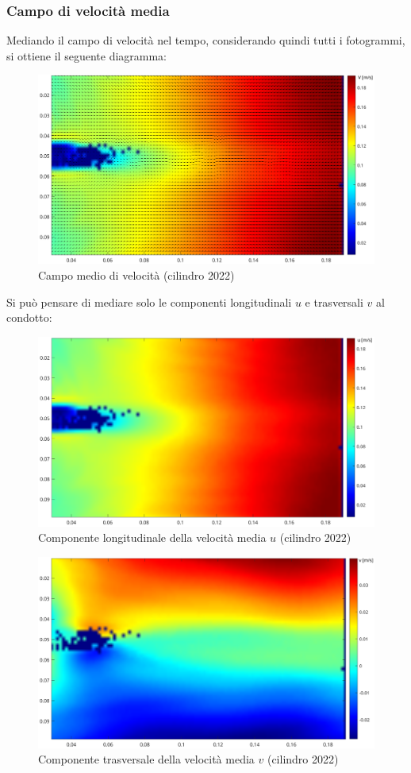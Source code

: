 \subsubsection{Campo di velocità media}
Mediando il campo di velocità nel tempo, considerando quindi tutti i fotogrammi, si ottiene il seguente diagramma:
\begin{figure}[H]
    \centering
    \includegraphics[width=.92\textwidth]{images/11/mean.png}
    \caption{Campo medio di velocità (cilindro 2022)}
\end{figure}

\noindent Si può pensare di mediare solo le componenti longitudinali $u$ e trasversali $v$ al condotto:
\begin{figure}[H]
    \centering
    \includegraphics[width=.92\textwidth]{images/11/Umean.png}
    \caption{Componente longitudinale della velocità media $u$ (cilindro 2022)}
\end{figure}

\begin{figure}[H]
    \centering
    \includegraphics[width=.8\textwidth]{images/11/vmean.png}
    \caption{Componente trasversale della velocità media $v$ (cilindro 2022)}
\end{figure}

